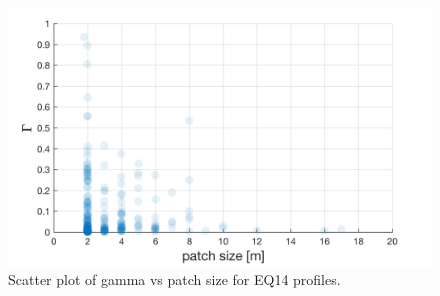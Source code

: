 \documentclass[11pt]{article}
\begin{document}
\begin{figure}[htbp]
\includegraphics[scale=0.8]{gamma_Vs_patchsize.png}
\caption{Scatter plot of gamma vs patch size for EQ14 profiles.}
\label{gamvspatchsize}
\end{figure}
\end{document}
